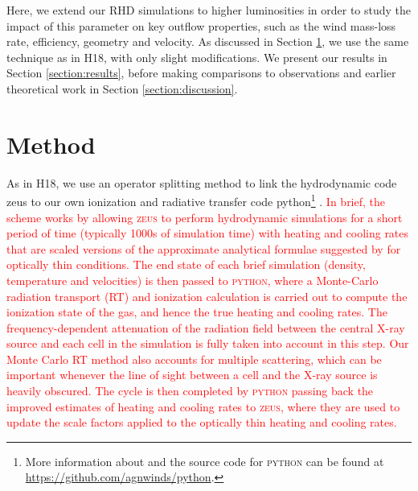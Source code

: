 \documentclass[a4paper,fleqn,usenatbib]{mnras}
\begin{document}
Here, we extend our RHD simulations to higher luminosities in order to
study the impact of this parameter on key outflow properties, such as
the wind mass-loss rate, efficiency, geometry and velocity. 
As discussed in Section \ref{section:method}, we  use the same
technique as in H18, with only slight modifications. We present
our results in Section \ref{section:results}, before making comparisons
to observations and earlier theoretical work in Section
\ref{section:discussion}.

\section{Method }
\label{section:method}

As in H18, we use an operator splitting method to link the hydrodynamic code {\sc zeus} 
\citep[][extended by \citealt{2000ApJ...543..686P}]{1992ApJS...80..753S} to our own ionization and
 radiative transfer code {\sc python}\footnote{More information about and the source code for 
 \textsc{python} can be found at \url{https://github.com/agnwinds/python}.} \citep[][extended by 
  \citealt{2005MNRAS.363..615S}, \citealt{,2013MNRAS.436.1390H} and
 \citealt{2015MNRAS.450.3331M}]{2002ApJ...579..725L}. \textcolor{red}{In brief, the scheme works
 by allowing \textsc{zeus} to perform hydrodynamic simulations for a short period of time
 (typically 1000s of simulation time) with heating and cooling rates that are scaled versions of the
 approximate analytical formulae suggested by \cite{1994ApJ...435..756B} for optically thin conditions. 
 The end state of each brief simulation
 (density, temperature and velocities) is then passed to \textsc{python}, where a Monte-Carlo
 radiation transport (RT) and ionization calculation is carried out to compute the ionization
 state of the gas, and hence the true heating and cooling rates. The frequency-dependent attenuation of the radiation field
 between the central X-ray source and each cell in the simulation is fully taken into account in this step.
 Our Monte Carlo RT method also accounts for multiple scattering, which can be important whenever the line of sight 
 between a cell and the X-ray source is heavily obscured. The cycle is 
 then completed by \textsc{python} passing back the improved estimates of heating and cooling 
 rates to \textsc{zeus}, where they are used to update the scale factors applied to the optically
 thin heating and cooling rates.}
  
\end{document}
